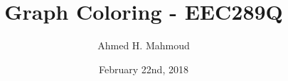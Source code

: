 \documentclass[12pt] {article}
\begin{document}
\title{Graph Coloring -  EEC289Q}
\author{Ahmed H. Mahmoud}
\date{February 22nd, 2018}
\maketitle
\end{document}
